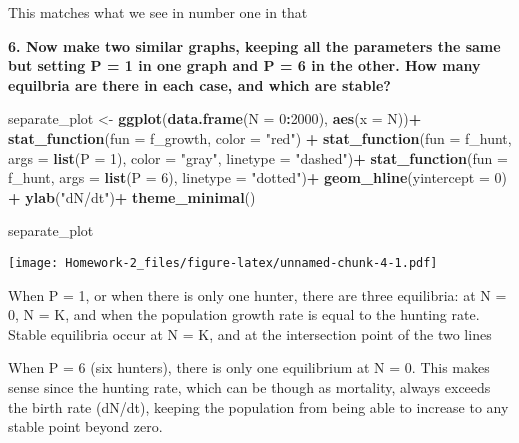 \documentclass[]{article}
\newenvironment{Shaded}{\begin{snugshade}}{\end{snugshade}}
\newcommand{\KeywordTok}[1]{\textcolor[rgb]{0.13,0.29,0.53}{\textbf{#1}}}
\newcommand{\DataTypeTok}[1]{\textcolor[rgb]{0.13,0.29,0.53}{#1}}
\newcommand{\DecValTok}[1]{\textcolor[rgb]{0.00,0.00,0.81}{#1}}
\newcommand{\StringTok}[1]{\textcolor[rgb]{0.31,0.60,0.02}{#1}}
\newcommand{\OperatorTok}[1]{\textcolor[rgb]{0.81,0.36,0.00}{\textbf{#1}}}
\newcommand{\NormalTok}[1]{#1}
\begin{document}
This matches what we see in number one in that

\textbf{6. Now make two similar graphs, keeping all the parameters the
same but setting P = 1 in one graph and P = 6 in the other. How many
equilbria are there in each case, and which are stable?}

\begin{Shaded}
\begin{Highlighting}[]
\NormalTok{separate_plot <-}\StringTok{ }\KeywordTok{ggplot}\NormalTok{(}\KeywordTok{data.frame}\NormalTok{(}\DataTypeTok{N =} \DecValTok{0}\OperatorTok{:}\DecValTok{2000}\NormalTok{), }\KeywordTok{aes}\NormalTok{(}\DataTypeTok{x =}\NormalTok{ N))}\OperatorTok{+}\StringTok{ }
\StringTok{  }\KeywordTok{stat_function}\NormalTok{(}\DataTypeTok{fun =}\NormalTok{ f_growth, }\DataTypeTok{color =} \StringTok{"red"}\NormalTok{) }\OperatorTok{+}
\StringTok{  }\KeywordTok{stat_function}\NormalTok{(}\DataTypeTok{fun =}\NormalTok{ f_hunt, }\DataTypeTok{args =} \KeywordTok{list}\NormalTok{(}\DataTypeTok{P =} \DecValTok{1}\NormalTok{), }\DataTypeTok{color =} \StringTok{"gray"}\NormalTok{, }\DataTypeTok{linetype =} \StringTok{"dashed"}\NormalTok{)}\OperatorTok{+}
\StringTok{  }\KeywordTok{stat_function}\NormalTok{(}\DataTypeTok{fun =}\NormalTok{ f_hunt, }\DataTypeTok{args =} \KeywordTok{list}\NormalTok{(}\DataTypeTok{P =} \DecValTok{6}\NormalTok{), }\DataTypeTok{linetype =} \StringTok{"dotted"}\NormalTok{)}\OperatorTok{+}
\StringTok{  }\KeywordTok{geom_hline}\NormalTok{(}\DataTypeTok{yintercept =} \DecValTok{0}\NormalTok{) }\OperatorTok{+}
\StringTok{  }\KeywordTok{ylab}\NormalTok{(}\StringTok{"dN/dt"}\NormalTok{)}\OperatorTok{+}
\StringTok{  }\KeywordTok{theme_minimal}\NormalTok{()}

\NormalTok{separate_plot}
\end{Highlighting}
\end{Shaded}

\texttt{[image: Homework-2\_files/figure-latex/unnamed-chunk-4-1.pdf]}

When P = 1, or when there is only one hunter, there are three
equilibria: at N = 0, N = K, and when the population growth rate is
equal to the hunting rate. Stable equilibria occur at N = K, and at the
intersection point of the two lines

When P = 6 (six hunters), there is only one equilibrium at N = 0. This
makes sense since the hunting rate, which can be though as mortality,
always exceeds the birth rate (dN/dt), keeping the population from being
able to increase to any stable point beyond zero.
\end{document}
